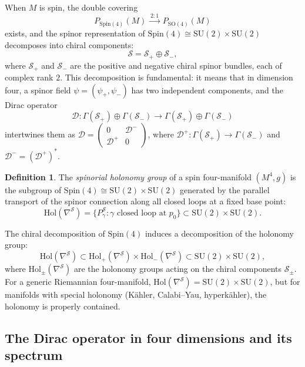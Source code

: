 \documentclass[12pt,a4paper]{article}
\theoremstyle{definition}
\newtheorem{definition}[theorem]{Definition}
\theoremstyle{remark}
\newcommand{\SO}{\mathrm{SO}}
\newcommand{\Spin}{\mathrm{Spin}}
\newcommand{\cD}{\mathcal{D}}
\newcommand{\cS}{\mathcal{S}}
\newcommand{\SU}{\mathrm{SU}}
\newcommand{\Hol}{\mathrm{Hol}}
\begin{document}
When $M$ is spin, the double covering
\begin{equation}
P_{\Spin(4)}(M) \xrightarrow{\; 2:1 \;} P_{\SO(4)}(M)
\end{equation}
exists, and the spinor representation of $\Spin(4) \cong \SU(2) \times \SU(2)$ decomposes into chiral components:
\begin{equation}
\cS = \cS_+ \oplus \cS_-,
\end{equation}
where $\cS_+$ and $\cS_-$ are the positive and negative chiral spinor bundles, each of complex rank $2$. This decomposition is fundamental: it means that in dimension four, a spinor field $\psi = (\psi_+, \psi_-)$ has two independent components, and the Dirac operator
\begin{equation}
\cD \colon \Gamma(\cS_+) \oplus \Gamma(\cS_-) \to \Gamma(\cS_+) \oplus \Gamma(\cS_-)
\end{equation}
intertwines them as $\cD = \begin{pmatrix} 0 & \cD^- \\ \cD^+ & 0 \end{pmatrix}$, where $\cD^+ \colon \Gamma(\cS_+) \to \Gamma(\cS_-)$ and $\cD^- = (\cD^+)^*$.

\begin{definition}
The \emph{spinorial holonomy group} of a spin four-manifold $(M^4, g)$ is the subgroup of $\Spin(4) \cong \SU(2) \times \SU(2)$ generated by the parallel transport of the spinor connection along all closed loops at a fixed base point:
\begin{equation}
\Hol(\nabla^{\cS}) = \{ P_\gamma^{\cS} : \gamma \text{ closed loop at } p_0 \} \subset \SU(2) \times \SU(2).
\end{equation}
\end{definition}

The chiral decomposition of $\Spin(4)$ induces a decomposition of the holonomy group:
\begin{equation}
\Hol(\nabla^{\cS}) \subset \Hol_+(\nabla^{\cS}) \times \Hol_-(\nabla^{\cS}) \subset \SU(2) \times \SU(2),
\end{equation}
where $\Hol_\pm(\nabla^{\cS})$ are the holonomy groups acting on the chiral components $\cS_\pm$. For a generic Riemannian four-manifold, $\Hol(\nabla^{\cS}) = \SU(2) \times \SU(2)$, but for manifolds with special holonomy (K\"ahler, Calabi--Yau, hyperk\"ahler), the holonomy is properly contained.

\subsection{The Dirac operator in four dimensions and its spectrum}
\end{document}
